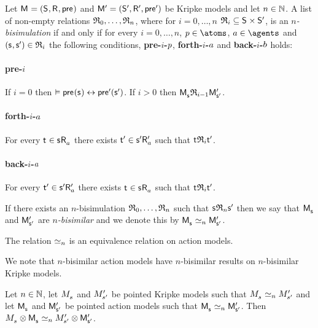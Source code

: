 \begin{definition}[$n$-bisimulation]
Let $\aModelAndTuple$ and $\aModelAndTupleP$ be Kripke models and let $n \in \naturals$.
A list of non-empty relations $\bisimulation_0, \dots, \bisimulation_n$, where for $i = 0, \dots, n$ $\bisimulation_i \subseteq \aStates \times \aStatesP$, is an {\em $n$-bisimulation} if and only if for every $i = 0, \dots, n$, $\atomP \in \atoms$, $\agentA \in \agents$ and $(\aStateS, \aStateSP) \in \bisimulation_i$ the following conditions, {\bf pre-$i$-$\atomP$}, {\bf forth-$i$-$\agentA$} and {\bf back-$i$-$\agentB$} holds:

\paragraph{pre-$i$}
If $i = 0$ then $\entails \aPrecondition(\aStateS) \iff \aPreconditionP(\aStateSP)$.
If $i > 0$ then $\aPModel{\aStateS} \bisimulation_{i-1} \aPModelP{\aStateSP}$.

\paragraph{forth-$i$-$\agentA$}
For every $\aStateT \in \aSuccessorsA{\aStateS}$ there exists $\aStateTP \in \aSuccessorsPA{\aStateSP}$ such that $\aStateT \bisimulation_i \aStateTP$.

\paragraph{back-$i$-$\agentA$}
For every $\aStateTP \in \aSuccessorsPA{\aStateSP}$ there exists $\aStateT \in \aSuccessorsA{\aStateS}$ such that $\aStateT \bisimulation_i \aStateTP$.

If there exists an $n$-bisimulation $\bisimulation_0, \dots, \bisimulation_n$ such that $\aStateS \bisimulation_n \aStateSP$ then we say that $\aPModel{\aStateS}$ and $\aPModelP{\aStateSP}$ are {\em $n$-bisimilar} and we denote this by $\aPModel{\aStateS} \bisimilar[n] \aPModelP{\aStateSP}$.
\end{definition}

\begin{proposition}
The relation $\bisimilar[n]$ is an equivalence relation on action models.
\end{proposition}

We note that $n$-bisimilar action models have $n$-bisimilar results on $n$-bisimilar Kripke models.

\begin{proposition}
Let $n \in \naturals$,
let $\kPModel{\kStateS}$ and $\kPModelP{\kStateSP}$ be pointed Kripke models such that $\kPModel{\kStateS} \bisimilar[n] \kPModelP{\kStateSP}$ and
let $\aPModel{\aStateS}$ and $\aPModelP{\aStateSP}$ be pointed action models such that $\aPModel{\aStateS} \bisimilar[n] \aPModelP{\aStateSP}$.
Then $\kPModel{\kStateS} \exec \aPModel{\aStateS} \bisimilar[n] \kPModelP{\kStateSP} \exec \aPModelP{\aStateSP}$.
\end{proposition}

